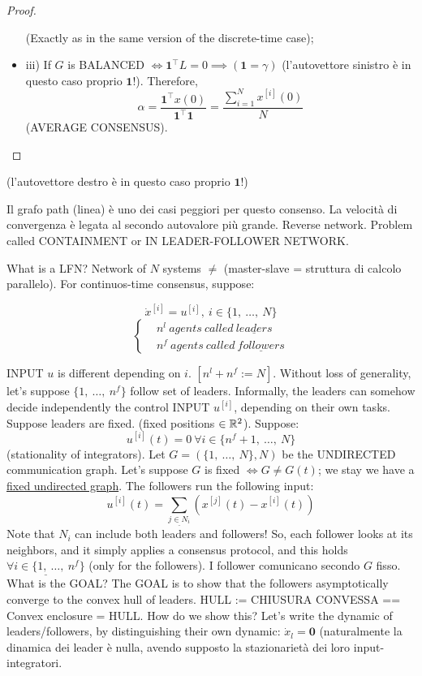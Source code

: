 \begin{proof}
\begin{itemize}
(Exactly as in the same version of the discrete-time case);
\item{iii)} If $G$ is BALANCED $\iff \mathbf{1}^\top L = 0 \implies (\mathbf{1}=\gamma)$ (l'autovettore sinistro è in questo caso proprio $\mathbf{1}$!). Therefore,
\[
	\alpha = \frac{\mathbf{1}^\top x(0)}{\mathbf{1}^\top \mathbf{1}} = \frac{\sum_{i=1}^N{x^{[i]}(0)}}{N}
\]
(AVERAGE CONSENSUS). \QEDA
\end{itemize}
\end{proof}(l'autovettore destro è in questo caso proprio $\mathbf{1}$!)

Il grafo path (linea) è uno dei casi peggiori per questo consenso. La velocità di convergenza è legata al secondo autovalore più grande.
Reverse network. Problem called CONTAINMENT or IN LEADER-FOLLOWER NETWORK.

What is a LFN? Network of $N$ systems $\neq$ (master-slave = struttura di calcolo parallelo). For continuos-time consensus, suppose:

\[
	\dot{x}^{[i]} = u^{[i]},\ i\in\{1,\ \dots,\ N\}
\]
\[	
	\left\{
	\begin{aligned}
	&n^l\ agents\ called\ \underline{leaders}\\
	&n^f\ agents\ called\ \underline{followers}
	\end{aligned} 
	\right.
\]

INPUT $u$ is different depending on $i$. $[n^l+n^f := N]$. Without loss of generality, let's suppose $\{1,\ \dots,\ n^f\}$ follow set of leaders. Informally, the leaders can somehow decide independently the control INPUT $u^{[i]}$, depending on their own tasks. Suppose leaders are fixed. (fixed positions $\in \mathbb{R}^2$). Suppose:
\[
	u^{[i]}(t) = 0\ \forall i \in\{n^f+1,\ \dots,\ N\}
\]
(stationality of integrators). Let $G=(\{1,\ \dots,\ N\},N)$ be the UNDIRECTED communication graph. Let's suppose $G$ is fixed $\iff G\neq G(t)$; we stay we have a \underline{fixed undirected graph}. The followers run the following input:
\[
	u^{[i]}(t) = \sum_{\underline{j\in N_i}}{(x^{[j]}(t)-x^{[i]}(t))}
\]
Note that $N_i$ can include both leaders and followers! So, each follower looks at its neighbors, and it simply applies a consensus protocol, and this holds $\underline{\forall i \in\{1,\ \dots,\ n^f\}}$ (only for the followers).
I follower comunicano secondo $G$ fisso. What is the GOAL? The GOAL is to show that the followers asymptotically converge to the convex hull of leaders. HULL := CHIUSURA CONVESSA == Convex enclosure = HULL. How do we show this? Let's write the dynamic of leaders/followers, by distinguishing their own dynamic: $\dot{x}_l = \mathbf{0}$ (naturalmente la dinamica dei leader è nulla, avendo supposto la stazionarietà dei loro input-integratori.

